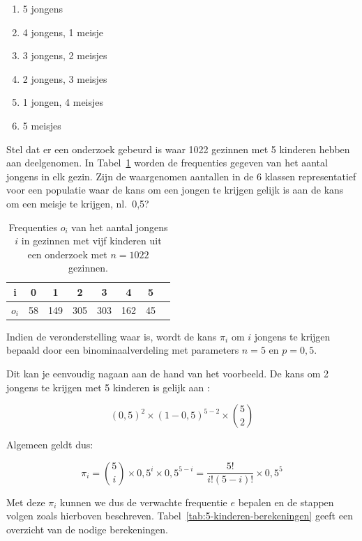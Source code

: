\begin{enumerate}
  \item 5 jongens
  \item 4 jongens, 1 meisje
  \item 3 jongens, 2 meisjes
  \item 2 jongens, 3 meisjes
  \item 1 jongen, 4 meisjes
  \item 5 meisjes
\end{enumerate}

Stel dat er een onderzoek gebeurd is waar 1022 gezinnen met 5 kinderen hebben aan deelgenomen. In Tabel~\ref{tab:5-kinderen} worden de frequenties gegeven van het aantal jongens in elk gezin. Zijn de waargenomen aantallen in de 6 klassen representatief voor een populatie waar de kans om een jongen te krijgen gelijk is aan de kans om een meisje te krijgen, nl.~0,5?

\begin{table}
  \centering
  \begin{tabular}{@{}cccccccc@{}}
    \toprule
    i       & 0  & 1   & 2   & 3   & 4   & 5  &  \\
    \midrule
    $o_{i}$ & 58 & 149 & 305 & 303 & 162 & 45 &  \\
    \bottomrule
  \end{tabular}
  \caption{Frequenties $o_i$ van het aantal jongens $i$ in gezinnen met vijf kinderen uit een onderzoek met $n = 1022$ gezinnen.}
  \label{tab:5-kinderen}
\end{table}

Indien de veronderstelling waar is, wordt de kans $\pi_{i}$ om $i$ jongens te krijgen bepaald door een binominaalverdeling met parameters $n=5$ en $p=0,5$.

Dit kan je eenvoudig nagaan aan de hand van het voorbeeld. De kans om 2 jongens te krijgen met 5 kinderen is gelijk aan :

\[ (0,5)^{2} \times (1-0,5)^{5-2} \times \binom{5}{2} \]

Algemeen geldt dus:

\[ \pi_{i} = \binom{5}{i}\times 0,5^{i} \times 0,5^{5-i} = \frac{5!}{i!(5-i)!}\times 0,5^{5} \]

Met deze $\pi_{i}$ kunnen we dus de verwachte frequentie $e$ bepalen en de stappen volgen zoals hierboven beschreven. Tabel~\ref{tab:5-kinderen-berekeningen} geeft een overzicht van de nodige berekeningen.

